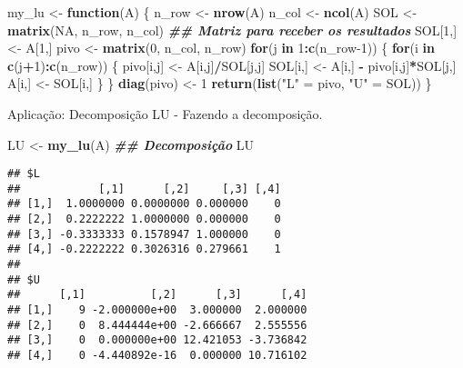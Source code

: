 \documentclass[
]{article}
\newenvironment{Shaded}{\begin{snugshade}}{\end{snugshade}}
\newcommand{\ConstantTok}[1]{\textcolor[rgb]{0.56,0.35,0.01}{#1}}
\newcommand{\ControlFlowTok}[1]{\textcolor[rgb]{0.13,0.29,0.53}{\textbf{#1}}}
\newcommand{\DecValTok}[1]{\textcolor[rgb]{0.00,0.00,0.81}{#1}}
\newcommand{\DocumentationTok}[1]{\textcolor[rgb]{0.56,0.35,0.01}{\textbf{\textit{#1}}}}
\newcommand{\FunctionTok}[1]{\textcolor[rgb]{0.13,0.29,0.53}{\textbf{#1}}}
\newcommand{\NormalTok}[1]{#1}
\newcommand{\OtherTok}[1]{\textcolor[rgb]{0.56,0.35,0.01}{#1}}
\newcommand{\SpecialCharTok}[1]{\textcolor[rgb]{0.81,0.36,0.00}{\textbf{#1}}}
\newcommand{\StringTok}[1]{\textcolor[rgb]{0.31,0.60,0.02}{#1}}
\begin{document}
\begin{Shaded}
\begin{Highlighting}[]
\NormalTok{my\_lu }\OtherTok{\textless{}{-}} \ControlFlowTok{function}\NormalTok{(A) \{}
\NormalTok{n\_row }\OtherTok{\textless{}{-}} \FunctionTok{nrow}\NormalTok{(A)}
\NormalTok{n\_col }\OtherTok{\textless{}{-}} \FunctionTok{ncol}\NormalTok{(A)}
\NormalTok{SOL }\OtherTok{\textless{}{-}} \FunctionTok{matrix}\NormalTok{(}\ConstantTok{NA}\NormalTok{, n\_row, n\_col) }\DocumentationTok{\#\# Matriz para receber os resultados}
\NormalTok{SOL[}\DecValTok{1}\NormalTok{,] }\OtherTok{\textless{}{-}}\NormalTok{ A[}\DecValTok{1}\NormalTok{,]}
\NormalTok{pivo }\OtherTok{\textless{}{-}} \FunctionTok{matrix}\NormalTok{(}\DecValTok{0}\NormalTok{, n\_col, n\_row)}
\ControlFlowTok{for}\NormalTok{(j }\ControlFlowTok{in} \DecValTok{1}\SpecialCharTok{:}\FunctionTok{c}\NormalTok{(n\_row}\DecValTok{{-}1}\NormalTok{)) \{}
\ControlFlowTok{for}\NormalTok{(i }\ControlFlowTok{in} \FunctionTok{c}\NormalTok{(j}\SpecialCharTok{+}\DecValTok{1}\NormalTok{)}\SpecialCharTok{:}\FunctionTok{c}\NormalTok{(n\_row)) \{}
\NormalTok{pivo[i,j] }\OtherTok{\textless{}{-}}\NormalTok{ A[i,j]}\SpecialCharTok{/}\NormalTok{SOL[j,j]}
\NormalTok{SOL[i,] }\OtherTok{\textless{}{-}}\NormalTok{ A[i,] }\SpecialCharTok{{-}}\NormalTok{ pivo[i,j]}\SpecialCharTok{*}\NormalTok{SOL[j,]}
\NormalTok{A[i,] }\OtherTok{\textless{}{-}}\NormalTok{ SOL[i,]}
\NormalTok{\}}
\NormalTok{\}}
\FunctionTok{diag}\NormalTok{(pivo) }\OtherTok{\textless{}{-}} \DecValTok{1}
\FunctionTok{return}\NormalTok{(}\FunctionTok{list}\NormalTok{(}\StringTok{"L"} \OtherTok{=}\NormalTok{ pivo, }\StringTok{"U"} \OtherTok{=}\NormalTok{ SOL)) \}}
\end{Highlighting}
\end{Shaded}

Aplicação: Decomposição LU - Fazendo a decomposição.

\begin{Shaded}
\begin{Highlighting}[]
\NormalTok{LU }\OtherTok{\textless{}{-}} \FunctionTok{my\_lu}\NormalTok{(A) }\DocumentationTok{\#\# Decomposição}
\NormalTok{LU}
\end{Highlighting}
\end{Shaded}

\begin{verbatim}
## $L
##            [,1]      [,2]     [,3] [,4]
## [1,]  1.0000000 0.0000000 0.000000    0
## [2,]  0.2222222 1.0000000 0.000000    0
## [3,] -0.3333333 0.1578947 1.000000    0
## [4,] -0.2222222 0.3026316 0.279661    1
## 
## $U
##      [,1]          [,2]      [,3]      [,4]
## [1,]    9 -2.000000e+00  3.000000  2.000000
## [2,]    0  8.444444e+00 -2.666667  2.555556
## [3,]    0  0.000000e+00 12.421053 -3.736842
## [4,]    0 -4.440892e-16  0.000000 10.716102
\end{verbatim}
\end{document}
